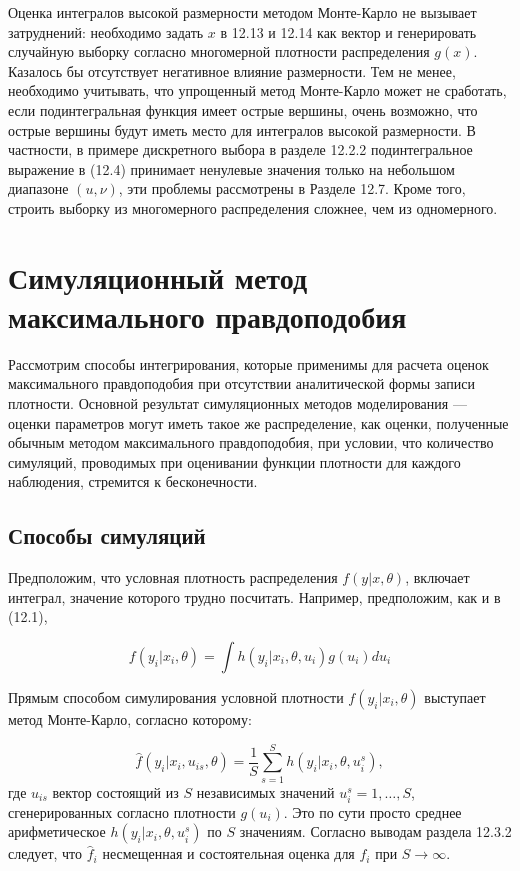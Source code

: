 Оценка интегралов высокой размерности методом Монте-Карло не вызывает затруднений: необходимо задать $x$ в 12.13 и 12.14 как вектор и генерировать случайную выборку согласно многомерной плотности распределения $g(x)$. Казалось бы отсутствует негативное влияние размерности. 
Тем не менее, необходимо учитывать, что упрощенный метод Монте-Карло может не сработать, если подинтегральная функция имеет острые вершины, очень возможно, что острые вершины будут иметь место для интегралов высокой размерности. 
В частности, в примере дискретного выбора в разделе 12.2.2 подинтегральное выражение в (12.4) принимает ненулевые значения  только на небольшом диапазоне $(u,\nu)$, эти проблемы рассмотрены в Разделе 12.7. Кроме того, строить выборку из многомерного распределения сложнее, чем из одномерного. 

\section{Симуляционный метод максимального правдоподобия}

Рассмотрим способы интегрирования, которые применимы для расчета оценок максимального правдоподобия при отсутствии аналитической формы записи плотности. Основной результат симуляционных методов моделирования --- оценки параметров могут иметь такое же распределение, как оценки, полученные обычным методом максимального правдоподобия, при условии, что количество симуляций, проводимых при оценивании функции плотности для каждого наблюдения, стремится к бесконечности.

\subsection{Способы симуляций}

Предположим, что условная плотность распределения $f(y|x,\theta)$, включает интеграл, значение которого трудно посчитать. Например, предположим, как и в (12.1),

\begin{equation}
f(y_i|x_i,\theta)=\int{h(y_i|x_i,\theta,u_i)g(u_i)du_i}
\end{equation}

Прямым способом симулирования условной плотности $f(y_i|x_i,\theta)$ выступает метод Монте-Карло, согласно которому:

\begin{equation}
\hat{f}(y_i|x_i,u_{is},\theta)=\dfrac{1}{S}\sum^{S}_{s=1}h(y_i|x_i, \theta, u^{s}_i),
\end{equation}
где $u_{is}$ вектор состоящий из $S$ независимых значений $u^{s}_{i}=1,\ldots ,S$, сгенерированных согласно плотности $g(u_i)$. Это по сути просто среднее арифметическое $h(y_i|x_i, \theta, u^{s}_{i})$ по $S$ значениям. Согласно выводам раздела 12.3.2 следует, что $\hat{f}_i$ несмещенная и состоятельная оценка для $f_i$ при $S \rightarrow \infty$.

